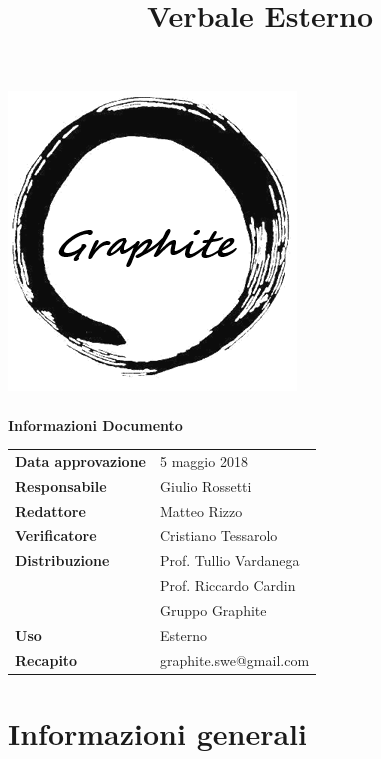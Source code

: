 \documentclass[openany,12pt,a4paper]{article}
\title{Verbale Esterno}
\author{}
\begin{document}
 
  \makeatletter 
  \begin{titlepage} 
    \setlength{\headsep}{0pt}   
    \begin{center} 
      \includegraphics[width=0.5\linewidth]{Logo.png}\\[1em] 
      {\huge \bfseries  \@title }\\[10ex] 
      \textbf{\Large Informazioni Documento} \\[2em] 
      \bgroup 
      \def\arraystretch{1.5} 
      \begin{tabular}{l|l} 
        \textbf{Data approvazione} & 5 maggio 2018 \\ 
        \textbf{Responsabile} & Giulio Rossetti \\ 
        \textbf{Redattore} & Matteo Rizzo \\ 
        \textbf{Verificatore} & Cristiano Tessarolo \\ 
        \textbf{Distribuzione} & Prof. Tullio Vardanega \\ 
         & Prof. Riccardo Cardin \\ 
         & Gruppo Graphite \\ 
        \textbf{Uso} & Esterno \\ 
        \textbf{Recapito} & graphite.swe@gmail.com \\ 
      \end{tabular} 
    \egroup 
    \end{center} 
  \end{titlepage} 
  \makeatother 
 
  \thispagestyle{empty} 
  \newpage 
   
  \tableofcontents 
  \newpage 
   
  \section{Informazioni generali} 
   
\end{document}
